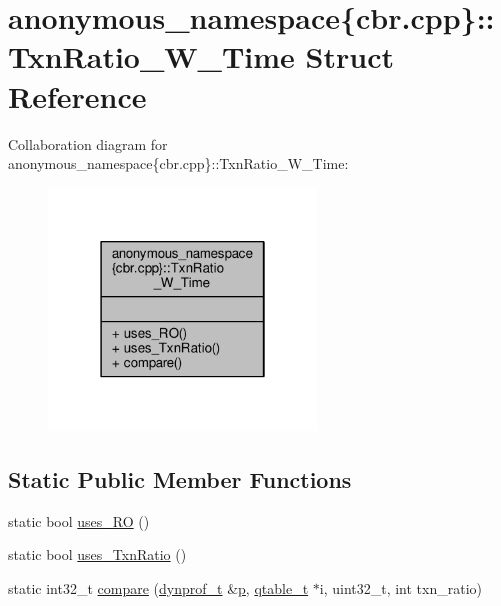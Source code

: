 \hypertarget{structanonymous__namespace_02cbr_8cpp_03_1_1TxnRatio__W__Time}{\section{anonymous\-\_\-namespace\{cbr.\-cpp\}\-:\-:Txn\-Ratio\-\_\-\-W\-\_\-\-Time Struct Reference}
\label{structanonymous__namespace_02cbr_8cpp_03_1_1TxnRatio__W__Time}
}


Collaboration diagram for anonymous\-\_\-namespace\{cbr.\-cpp\}\-:\-:Txn\-Ratio\-\_\-\-W\-\_\-\-Time\-:
\nopagebreak
\begin{figure}[H]
\begin{center}
\leavevmode
\includegraphics[width=202pt]{structanonymous__namespace_02cbr_8cpp_03_1_1TxnRatio__W__Time__coll__graph}
\end{center}
\end{figure}
\subsection*{Static Public Member Functions}
\begin{DoxyCompactItemize}
\item 
static bool \hyperlink{structanonymous__namespace_02cbr_8cpp_03_1_1TxnRatio__W__Time_a110a6152abeffd15cd6206bbfbee9c25}{uses\-\_\-\-R\-O} ()
\item 
static bool \hyperlink{structanonymous__namespace_02cbr_8cpp_03_1_1TxnRatio__W__Time_a5de55e1ff30016b732fa7f75ebd497ce}{uses\-\_\-\-Txn\-Ratio} ()
\item 
static int32\-\_\-t \hyperlink{structanonymous__namespace_02cbr_8cpp_03_1_1TxnRatio__W__Time_add978feb5d153041cfa421c38f5d1bf7}{compare} (\hyperlink{structstm_1_1dynprof__t}{dynprof\-\_\-t} \&\hyperlink{counted__ptr_8hpp_a5c9f59d7c24e3fd6ceae319a968fc3e0}{p}, \hyperlink{structstm_1_1qtable__t}{qtable\-\_\-t} $\ast$i, uint32\-\_\-t, int txn\-\_\-ratio)
\end{DoxyCompactItemize}


